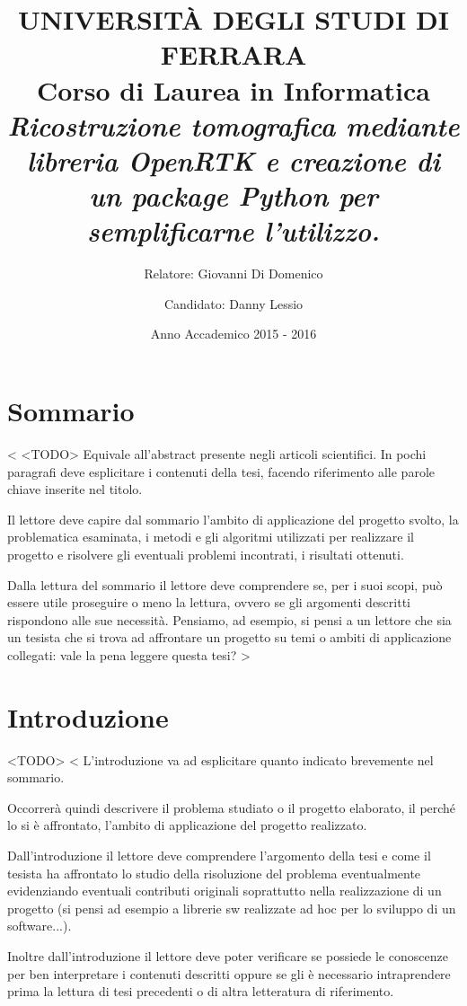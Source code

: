 \documentclass[a4paper,11pt, oneside]{article}
\title{\textbf{UNIVERSITÀ DEGLI STUDI DI FERRARA\\}
\bigskip
Corso di Laurea in Informatica\\
\bigskip
\bigskip
\bigskip
\textit{Ricostruzione tomografica mediante libreria OpenRTK e creazione di un package Python per semplificarne l'utilizzo.\\}
\bigskip
\bigskip
\bigskip
\bigskip
\bigskip
\bigskip
\bigskip
\bigskip
\bigskip
\bigskip
\bigskip
\bigskip
\bigskip
\bigskip
\bigskip
\bigskip
\bigskip
\bigskip
\bigskip
\bigskip
}
\author{Relatore: Giovanni Di Domenico\and
Candidato: Danny Lessio}
\date{Anno Accademico 2015 - 2016}
\begin{document}
    \maketitle
    \newpage
    
    \part*{Sommario}
        \par
        	< 	
        	    <TODO>
        		Equivale all'abstract presente negli articoli scientifici.
        		In pochi paragrafi deve esplicitare i contenuti della tesi, facendo riferimento alle parole chiave inserite nel titolo.
        
        		Il lettore deve capire dal sommario l'ambito di applicazione del progetto svolto, la problematica esaminata, i metodi e gli algoritmi utilizzati per realizzare il progetto e risolvere gli eventuali problemi incontrati, i risultati ottenuti.
        
        		Dalla lettura del sommario il lettore deve comprendere se, per i suoi scopi, può essere utile proseguire o meno la lettura, ovvero se gli argomenti descritti rispondono alle sue necessità. Pensiamo, ad esempio, si pensi a un lettore che sia un tesista che si trova ad affrontare un progetto su temi o ambiti di applicazione collegati: vale la pena leggere questa tesi? 
        	>
    
    \newpage
    \part*{Introduzione}
        \par
            <TODO>
            <
        		L'introduzione va ad esplicitare quanto indicato brevemente nel sommario.
        
        		Occorrerà quindi descrivere il problema studiato o il progetto elaborato, il perché lo si è affrontato, l'ambito di applicazione del progetto realizzato.
        
        		Dall'introduzione il lettore deve comprendere l'argomento della tesi e come il tesista ha affrontato lo studio della risoluzione del problema eventualmente evidenziando eventuali contributi originali soprattutto nella realizzazione di un progetto (si pensi ad esempio a librerie sw realizzate ad hoc per lo sviluppo di un software...).
        
        		Inoltre dall'introduzione il lettore deve poter verificare se possiede le conoscenze per ben interpretare i contenuti descritti oppure se gli è necessario intraprendere prima la lettura di tesi precedenti o di altra letteratura di riferimento.
        
\end{document}
